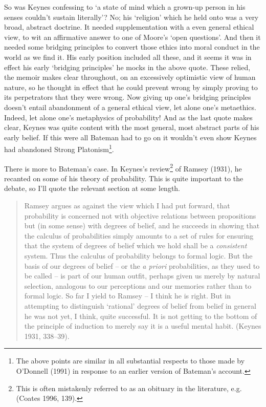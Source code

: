 \documentclass[noflushend]{philosophersimprint}
\begin{document}
So was Keynes confessing to `a state of mind which a grown-up person in
his senses couldn't sustain literally'? No; his `religion' which he held
onto was a very broad, abstract doctrine. It needed supplementation with
a even general ethical view, to wit an affirmative answer to one of
Moore's `open questions'. And then it needed some bridging principles to
convert those ethics into moral conduct in the world as we find it. His
early position included all these, and it seems it was in effect his
early `bridging principles' he mocks in the above quote. These relied,
the memoir makes clear throughout, on an excessively optimistic view of
human nature, so he thought in effect that he could prevent wrong by
simply proving to its perpetrators that they were wrong. Now giving up
one's bridging principles doesn't entail abandonment of a general
ethical view, let alone one's metaethics. Indeed, let alone one's
metaphysics of probability! And as the last quote makes clear, Keynes
was quite content with the most general, most abstract parts of his
early belief. If this were all Bateman had to go on it wouldn't even
show Keynes had abandoned Strong Platonism\footnote{The above points are
  similar in all substantial respects to those made by O'Donnell (1991)
  in response to an earlier version of Bateman's account.}.

There is more to Bateman's case. In Keynes's review\footnote{This is
  often mistakenly referred to as an obituary in the literature, e.g.
  (Coates 1996, 139).} of Ramsey (1931), he recanted on some of his
theory of probability. This is quite important to the debate, so I'll
quote the relevant section at some length.

\begin{quote}
Ramsey argues as against the view which I had put forward, that
probability is concerned not with objective relations between
propositions but (in some sense) with degrees of belief, and he succeeds
in showing that the calculus of probabilities simply amounts to a set of
rules for ensuring that the system of degrees of belief which we hold
shall be a \emph{consistent} system. Thus the calculus of probability
belongs to formal logic. But the basis of our degrees of belief -- or
the \emph{a priori} probabilities, as they used to be called -- is part
of our human outfit, perhaps given us merely by natural selection,
analogous to our perceptions and our memories rather than to formal
logic. So far I yield to Ramsey -- I think he is right. But in
attempting to distinguish `rational' degrees of belief from belief in
general he was not yet, I think, quite successful. It is not getting to
the bottom of the principle of induction to merely say it is a useful
mental habit. (Keynes 1931, 338--39).
\end{quote}
\end{document}
